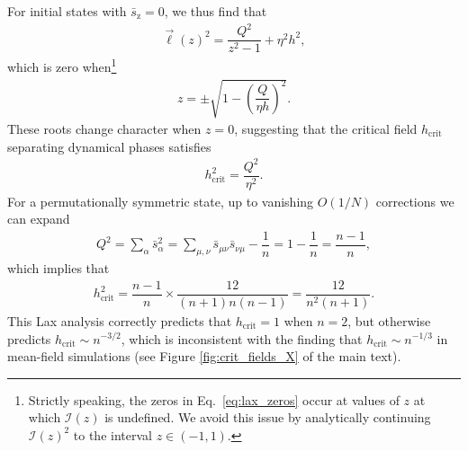 \documentclass[nofootinbib,twocolumn]{revtex4-2}
\renewcommand{\t}{\text} %
\newcommand{\f}[2]{\dfrac{#1}{#2}} %
\newcommand{\p}[1]{\left(#1\right)} %
\newcommand{\1}{\mathds{1}}
\newcommand{\z}{\text{z}}
\newcommand{\I}{\mathcal{I}}
\begin{document}
For initial states with $\bar s_\z=0$, we thus find that
\begin{align}
  \vec\ell\p{z}^2 = \f{Q^2}{z^2-1} + \eta^2 h^2,
\end{align}
which is zero when\footnote{Strictly speaking, the zeros in Eq.~\eqref{eq:lax_zeros} occur at values of $z$ at which $\I\p{z}$ is undefined.
We avoid this issue by analytically continuing $\I\p{z}^2$ to the interval $z\in(-1,1)$.}
\begin{align}
  z = \pm \sqrt{1 - \p{\f{Q}{\eta h}}^2}.
  \label{eq:lax_zeros}
\end{align}
These roots change character when $z=0$, suggesting that the critical field $h_{\t{crit}}$ separating dynamical phases satisfies
\begin{align}
  h_{\t{crit}}^2 = \f{Q^2}{\eta^2}.
\end{align}
For a permutationally symmetric state, up to vanishing $O(1/N)$ corrections we can expand
\begin{align}
  Q^2 = \sum_\alpha \bar s_\alpha^2
  = \sum_{\mu,\nu} \bar s_{\mu\nu} \bar s_{\nu\mu} - \f1n
  = 1 - \f1n
  = \f{n-1}{n},
\end{align}
which implies that
\begin{align}
  h_{\t{crit}}^2 = \f{n-1}{n} \times \f{12}{(n+1)n(n-1)}
  = \f{12}{n^2\p{n+1}}.
\end{align}
This Lax analysis correctly predicts that $h_{\t{crit}}=1$ when $n=2$, but otherwise predicts $h_{\t{crit}}\sim n^{-3/2}$, which is inconsistent with the finding that $h_{\t{crit}}\sim n^{-1/3}$ in mean-field simulations (see Figure \ref{fig:crit_fields_X} of the main text).
\end{document}
